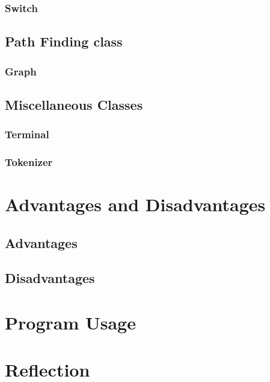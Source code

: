 \documentclass{article}
\begin{document}
\subsubsection{Switch}

\subsection{Path Finding class}

\subsubsection{Graph}

\subsection{Miscellaneous Classes}

\subsubsection{Terminal}

\subsubsection{Tokenizer}

\section{Advantages and Disadvantages}

\subsection{Advantages}

\subsection{Disadvantages}

\section{Program Usage}

\section{Reflection}
\end{document}
